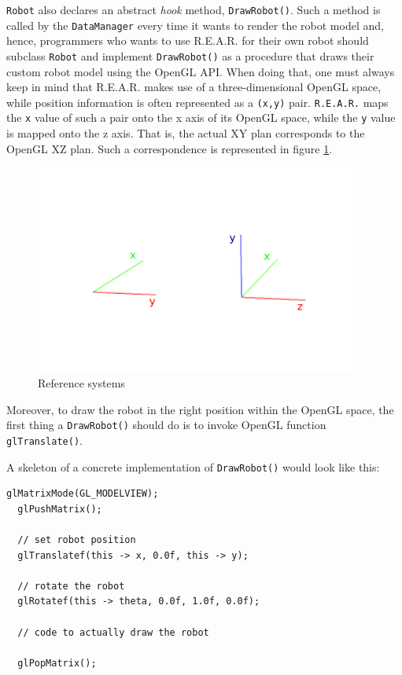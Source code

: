 %
\texttt{Robot} also declares an abstract \textit{hook} method, 
\texttt{DrawRobot()}. Such a method is called by the 
\texttt{DataManager} every time it wants to render the 
robot model and, hence, programmers who wants to 
use \textsf{R.E.A.R.} for their own robot should subclass 
\texttt{Robot} and implement \texttt{DrawRobot()} as a 
procedure that draws their custom robot model using 
the OpenGL API.
%
When doing that, one must always keep in mind that 
\textsf{R.E.A.R.} makes use of a three-dimensional OpenGL 
space, while position information is often represented 
as a \texttt{(x,y)} pair. \texttt{R.E.A.R.} maps the \texttt{x} 
value of such a pair onto the x axis of its OpenGL space, 
while the \texttt{y} value is mapped onto the z axis.
%
That is, the actual XY plan corresponds to the OpenGL 
XZ plan. Such a correspondence is represented in figure 
\ref{fig:reference_systems}.
%
\begin{figure}[!h]
  \begin{center}
    \includegraphics[width=300pt]{img/reference_system.png}
    \caption{Reference systems}
    \label{fig:reference_systems}
  \end{center}
\end{figure}
%

%
Moreover, to draw the robot in the right position within 
the OpenGL space, the first thing a \texttt{DrawRobot()} should 
do is to invoke OpenGL function \texttt{glTranslate()}.
%

%
A skeleton of a concrete implementation of \texttt{DrawRobot()}
would look like this:
\begin{lstlisting}[caption={\texttt{Robot} class declaration}, label={code:robot_class}, frame=trBL]  
  glMatrixMode(GL_MODELVIEW);
  glPushMatrix();

  // set robot position
  glTranslatef(this -> x, 0.0f, this -> y);

  // rotate the robot 
  glRotatef(this -> theta, 0.0f, 1.0f, 0.0f);

  // code to actually draw the robot

  glPopMatrix();
\end{lstlisting}
%

